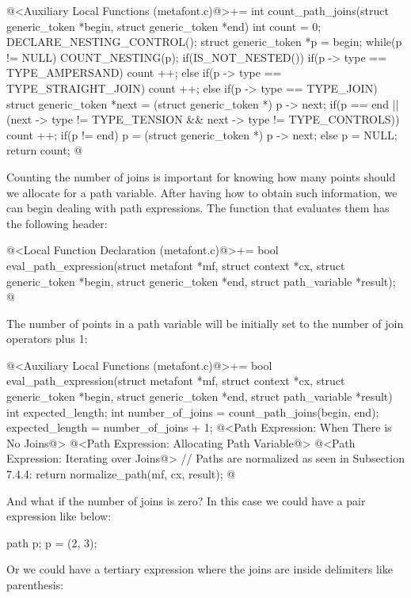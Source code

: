 \iniciocodigo
@<Auxiliary Local Functions (metafont.c)@>+=
int count_path_joins(struct generic_token *begin, struct generic_token *end){
int count = 0;
  DECLARE_NESTING_CONTROL();
  struct generic_token *p = begin;
  while(p != NULL){
    COUNT_NESTING(p);
    if(IS_NOT_NESTED()){
      if(p -> type == TYPE_AMPERSAND)
        count ++;
      else if(p -> type == TYPE_STRAIGHT_JOIN)
        count ++;
      else if(p -> type == TYPE_JOIN){
        struct generic_token *next = (struct generic_token *) p -> next;
        if(p == end || (next -> type !=  TYPE_TENSION &&
                        next -> type != TYPE_CONTROLS))
          count ++;
      }
    }
    if(p != end)
      p = (struct generic_token *) p -> next;
    else
      p = NULL;
  }
  return count;
}
@
\fimcodigo

Counting the number of joins is important for knowing how many points
should we allocate for a path variable. After having how to obtain
such information, we can begin dealing with path expressions. The
function that evaluates them has the following header:

\iniciocodigo
@<Local Function Declaration (metafont.c)@>+=
bool eval_path_expression(struct metafont *mf, struct context *cx,
                          struct generic_token *begin,
                          struct generic_token *end,
                          struct path_variable *result);
@
\fimcodigo

The number of points in a path variable will be initially set to the
number of join operators plus 1:

\iniciocodigo
@<Auxiliary Local Functions (metafont.c)@>+=
bool eval_path_expression(struct metafont *mf, struct context *cx,
                          struct generic_token *begin,
                          struct generic_token *end,
                          struct path_variable *result){
  int expected_length;
  int number_of_joins = count_path_joins(begin, end);
  expected_length = number_of_joins + 1;
  @<Path Expression: When There is No Joins@>
  @<Path Expression: Allocating Path Variable@>
  @<Path Expression: Iterating over Joins@>
  // Paths are normalized as seen in Subsection 7.4.4:
  return normalize_path(mf, cx, result);
}
@
\fimcodigo

And what if the number of joins is zero? In this case we could have a
pair expression like below:

\alinhaverbatim
path p;
p = (2, 3);
\alinhanormal

Or we could have a tertiary expression where the joins are inside
delimiters like parenthesis:

